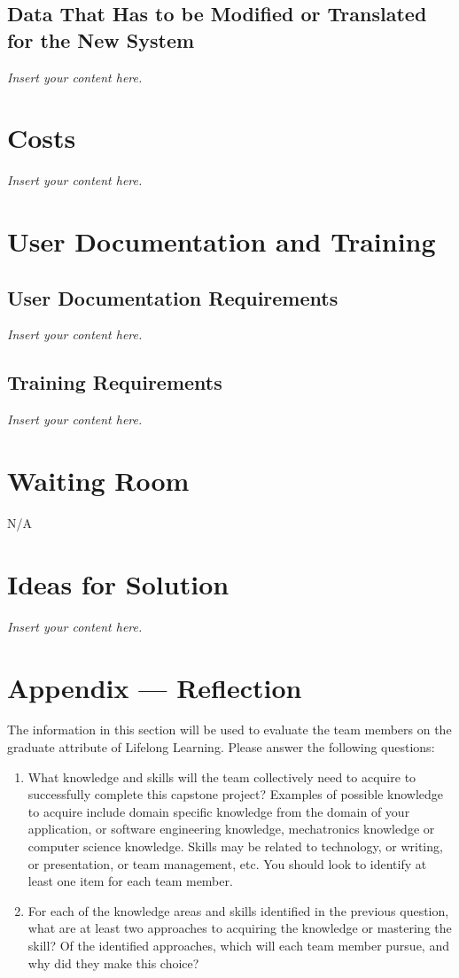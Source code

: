 \documentclass[12pt]{article}
\newcommand{\lips}{\textit{Insert your content here.}}
\begin{document}
\subsection{Data That Has to be Modified or Translated for the New System}
\lips

\section{Costs}
\lips
\section{User Documentation and Training}
\subsection{User Documentation Requirements}
\lips
\subsection{Training Requirements}
\lips

\section{Waiting Room}
N/A

\section{Ideas for Solution}
\lips

\newpage{}
\section*{Appendix --- Reflection}

The information in this section will be used to evaluate the team members on the
graduate attribute of Lifelong Learning.  Please answer the following questions:

\begin{enumerate}
  \item What knowledge and skills will the team collectively need to acquire to
  successfully complete this capstone project?  Examples of possible knowledge
  to acquire include domain specific knowledge from the domain of your
  application, or software engineering knowledge, mechatronics knowledge or
  computer science knowledge.  Skills may be related to technology, or writing,
  or presentation, or team management, etc.  You should look to identify at
  least one item for each team member.
  \item For each of the knowledge areas and skills identified in the previous
  question, what are at least two approaches to acquiring the knowledge or
  mastering the skill?  Of the identified approaches, which will each team
  member pursue, and why did they make this choice?
\end{enumerate}
\end{document}
